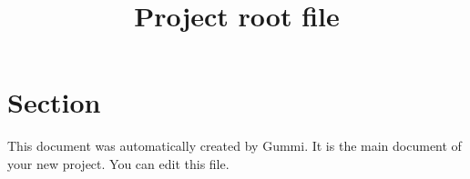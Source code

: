 \documentclass[11pt]{article}
\title{\textbf{Project root file}}
\date{}
\begin{document}
\maketitle

\section{Section}
This document was automatically created by Gummi.
It is the main document of your new project.
You can edit this file.
\end{document}
